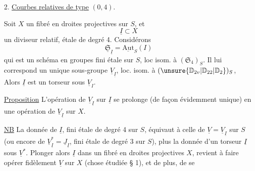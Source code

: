 2. \uline{Courbes relatives de type} $(0,4)$.

Soit $X$ un fibré en droites projectives sur $S$, et
\[
 \underline I\subset X \tag*{(9)}
\]
un diviseur relatif, étale de degré 4. Considérons
\[
 \underline{\mathfrak S}_{\underline I}=\underline{\mathrm{Aut}}_S(I) \tag*{(10)}
\]
qui est un schéma en groupes fini étale sur $S$, loc isom. à $(\mathfrak S_4)_S$. Il lui correspond un unique sous-groupe  $\underline V_{\underline I}$, loc. isom. à $(\unsure{\mathbb D_{2v}|\mathbb D_{22}|\mathbb D_2})_S$,  Alors $\underline I$ est un torseur sous $\underline V_I$.

\uline{Proposition} \quad L'opération de $\underline V_{\underline I}$ sur $\underline I$ se prolonge (de façon évidemment unique) en une opération de $\underline V_{\underline I}$ sur $X$.

\uline{NB} La donnée de $\underline I$, fini étale de degré 4 sur $S$, équivaut à celle de $\underline V=\underline V_{\underline I}$ sur $S$ (ou encore de $\underline V_{\underline I}^*=\underline J_{\underline I}$, fini étale de degré 3 sur $S$), plus la donnée d'un torseur $\underline I$ sous $\underline V^*$. Plonger alors $\underline I$ dans un fibré en droites projectives $X$, revient à faire opérer fidèlement $\underline V$ sur $X$ (chose étudiée  § 1), et de plus, de se

